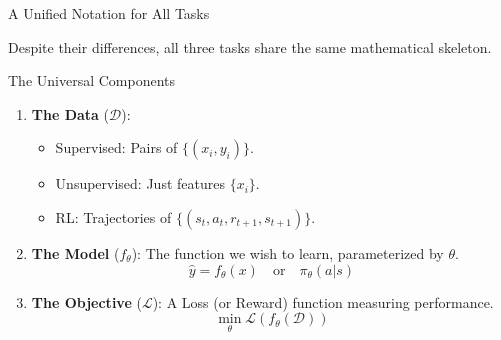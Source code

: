 \documentclass[aspectratio=169]{beamer}
\newcommand{\1}{\mathbf{1}}
\newcommand{\loss}{\mathcal{L}}
\newcommand{\D}{\mathcal{D}}
\begin{document}
\begin{frame}{A Unified Notation for All Tasks}
    
    
    Despite their differences, all three tasks share the same mathematical skeleton.
    
    \begin{block}{The Universal Components}
    \begin{enumerate}
        \item \textbf{The Data} ($\D$): 
        \begin{itemize}
            \item Supervised: Pairs of $\{(x_i, y_i)\}$.
            \item Unsupervised: Just features $\{x_i\}$.
            \item RL: Trajectories of $\{(s_t, a_t, r_{t+1}, s_{t+1})\}$.
        \end{itemize}
        
        \item \textbf{The Model} ($f_{\theta}$): 
        The function we wish to learn, parameterized by $\theta$.
        $$ \hat{y} = f_\theta(x) \quad \text{or} \quad \pi_\theta(a|s) $$
        
        \item \textbf{The Objective} ($\loss$): 
        A Loss (or Reward) function measuring performance.
        $$ \min_{\theta} \mathcal{L}(f_\theta(\D)) $$
    \end{enumerate}
    \end{block}
\end{frame}
\end{document}
